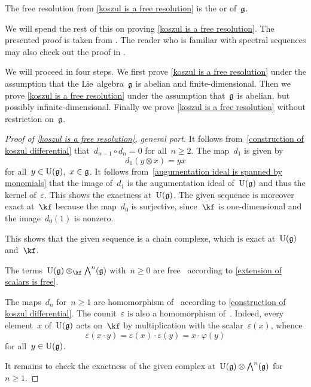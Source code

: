 \begin{definition}
  The free resolution from \cref{koszul is a free resolution} is the  or  of~$\mathfrak{g}$.
\end{definition}


\begin{fluff}
  We will spend the rest of this  on proving \cref{koszul is a free resolution}.
  The presented proof is taken from \cite[IV.6]{knapp}.
  The reader who is familiar with spectral sequences may also check out the proof in \cite[Theorem~7.2.2]{weibel_homological_algebra}.

  We will proceed in four steps.
  We first prove \cref{koszul is a free resolution} under the assumption that the Lie~algebra~$\mathfrak{g}$ is abelian and finite-dimensional.
  Then we prove \cref{koszul is a free resolution} under the assumption that~$\mathfrak{g}$ is abelian, but possibly infinite-dimensional.
  Finally we prove \cref{koszul is a free resolution} without restriction on~$\mathfrak{g}$.
\end{fluff}


\begin{proof}[Proof of \cref{koszul is a free resolution}, general part]
  It follows from~\cref{construction of koszul differential} that~$d_{n-1} \circ d_n = 0$ for all~$n \geq 2$.
  The map~$d_1$ is given by
  \[
    d_1( y \otimes x )
    =
    yx
  \]
  for all~$y \in \operatorname{U}(\mathfrak{g})$,~$x \in \mathfrak{g}$.
  It follows from~\cref{augumentation ideal is spanned by monomials} that the image of~$d_1$ is the augumentation ideal of~$\Univ(\glie)$ and thus the kernel of~$\varepsilon$.
  This shows the exactness at~$\Univ(\glie)$.
  The given sequence is moreover exact at~$\kf$ because the map~$d_0$ is surjective, since~$\kf$ is one-dimensional and the image~$d_0(1)$ is nonzero.

  This shows that the given sequence is a chain complexe, which is exact at~$\Univ(\glie)$ and~$\kf$.

  The terms~$\Univ(\glie) \otimes_{\kf} \Exterior^n(\glie)$ with~$n \geq 0$ are free~\modules{$\Univ(\glie)$} according to \cref{extension of scalars is free}.

  The maps~$d_n$ for~$n \geq 1$ are homomorphism of~\modules{$\Univ(\glie)$} according to \cref{construction of koszul differential}.
  The counit~$\varepsilon$ is also a homomorphism of~\modules{$\Univ(\glie)$}.
  Indeed, every element~$x$ of~$\Univ(\glie)$ acts on~$\kf$ by multiplication with the scalar~$\varepsilon(x)$, whence
  \[
    \varepsilon(x \cdot y)
    =
    \varepsilon(x) \cdot \varepsilon(y)
    =
    x \cdot \varphi(y)
  \]
  for all~$y \in \operatorname{U}(\mathfrak{g})$.

  It remains to check the exactness of the given complex at~$\operatorname{U}(\mathfrak{g}) \otimes \operatorname{\bigwedge}^n(\mathfrak{g})$ for~$n \geq 1$.
\end{proof}


